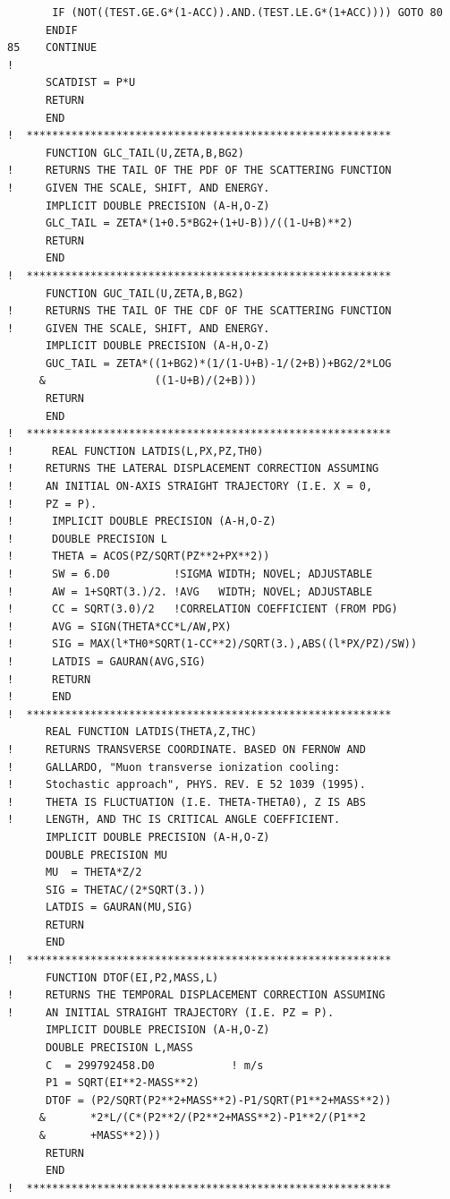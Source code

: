 \begin{lstlisting}
       IF (NOT((TEST.GE.G*(1-ACC)).AND.(TEST.LE.G*(1+ACC)))) GOTO 80
      ENDIF
85    CONTINUE
!
      SCATDIST = P*U
      RETURN
      END
!  *********************************************************
      FUNCTION GLC_TAIL(U,ZETA,B,BG2)
!     RETURNS THE TAIL OF THE PDF OF THE SCATTERING FUNCTION
!     GIVEN THE SCALE, SHIFT, AND ENERGY.
      IMPLICIT DOUBLE PRECISION (A-H,O-Z)
      GLC_TAIL = ZETA*(1+0.5*BG2+(1+U-B))/((1-U+B)**2)
      RETURN
      END
!  *********************************************************
      FUNCTION GUC_TAIL(U,ZETA,B,BG2)
!     RETURNS THE TAIL OF THE CDF OF THE SCATTERING FUNCTION
!     GIVEN THE SCALE, SHIFT, AND ENERGY.
      IMPLICIT DOUBLE PRECISION (A-H,O-Z)
      GUC_TAIL = ZETA*((1+BG2)*(1/(1-U+B)-1/(2+B))+BG2/2*LOG
     &                 ((1-U+B)/(2+B)))
      RETURN
      END      
!  *********************************************************
!      REAL FUNCTION LATDIS(L,PX,PZ,TH0)
!     RETURNS THE LATERAL DISPLACEMENT CORRECTION ASSUMING
!     AN INITIAL ON-AXIS STRAIGHT TRAJECTORY (I.E. X = 0,
!     PZ = P).
!      IMPLICIT DOUBLE PRECISION (A-H,O-Z)
!      DOUBLE PRECISION L
!      THETA = ACOS(PZ/SQRT(PZ**2+PX**2))
!      SW = 6.D0          !SIGMA WIDTH; NOVEL; ADJUSTABLE
!      AW = 1+SQRT(3.)/2. !AVG   WIDTH; NOVEL; ADJUSTABLE
!      CC = SQRT(3.0)/2   !CORRELATION COEFFICIENT (FROM PDG)
!      AVG = SIGN(THETA*CC*L/AW,PX)
!      SIG = MAX(l*TH0*SQRT(1-CC**2)/SQRT(3.),ABS((l*PX/PZ)/SW))
!      LATDIS = GAURAN(AVG,SIG)
!      RETURN
!      END
!  *********************************************************
      REAL FUNCTION LATDIS(THETA,Z,THC)
!     RETURNS TRANSVERSE COORDINATE. BASED ON FERNOW AND
!     GALLARDO, "Muon transverse ionization cooling: 
!     Stochastic approach", PHYS. REV. E 52 1039 (1995).
!     THETA IS FLUCTUATION (I.E. THETA-THETA0), Z IS ABS
!     LENGTH, AND THC IS CRITICAL ANGLE COEFFICIENT.
      IMPLICIT DOUBLE PRECISION (A-H,O-Z)
      DOUBLE PRECISION MU
      MU  = THETA*Z/2
      SIG = THETAC/(2*SQRT(3.))
      LATDIS = GAURAN(MU,SIG)
      RETURN
      END
!  *********************************************************
      FUNCTION DTOF(EI,P2,MASS,L)
!     RETURNS THE TEMPORAL DISPLACEMENT CORRECTION ASSUMING
!     AN INITIAL STRAIGHT TRAJECTORY (I.E. PZ = P).
      IMPLICIT DOUBLE PRECISION (A-H,O-Z)
      DOUBLE PRECISION L,MASS
      C  = 299792458.D0            ! m/s
      P1 = SQRT(EI**2-MASS**2)
      DTOF = (P2/SQRT(P2**2+MASS**2)-P1/SQRT(P1**2+MASS**2))
     &       *2*L/(C*(P2**2/(P2**2+MASS**2)-P1**2/(P1**2
     &       +MASS**2)))
      RETURN
      END
!  *********************************************************

\end{lstlisting}
